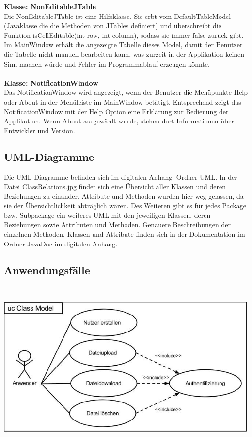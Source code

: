 \documentclass[13pt,a4paper,bibliography=totocnumbered,listof=totocnumbered]{scrartcl}
\begin{document}
\textbf{Klasse: NonEditableJTable}\\
Die NonEditableJTable ist eine Hilfsklasse. Sie erbt vom DefaultTableModel (Javaklasse die die Methoden von JTables definiert) und überschreibt die Funktion isCellEditable(int row, int column), sodass sie immer false zurück gibt. Im MainWindow erhält die angezeigte Tabelle dieses Model, damit der Benutzer die Tabelle nicht manuell bearbeiten kann, was zurzeit in der Applikation keinen Sinn machen würde und Fehler im Programmablauf erzeugen könnte.\\\\
\textbf{Klasse: NotificationWindow}\\
Das NotificationWindow wird angezeigt, wenn der Benutzer die Menüpunkte Help oder About in der Menüleiste im MainWindow betätigt. Entsprechend zeigt das NotificationWindow mit der Help Option eine Erklärung zur Bedienung der Applikation. Wenn About ausgewählt wurde, stehen dort Informationen über Entwickler und Version.


\subsection{UML-Diagramme}
Die UML Diagramme befinden sich im digitalen Anhang, Ordner UML. In der Datei ClassRelations.jpg findet sich eine Übersicht aller Klassen und deren Beziehungen zu einander. Attribute und Methoden wurden hier weg gelassen, da sie der Übersichtlichkeit abträglich wären. Des Weiteren gibt es für jedes Package bzw. Subpackage ein weiteres UML mit den jeweiligen Klassen, deren Beziehungen sowie Attributen und Methoden. Genauere Beschreibungen der einzelnen Methoden, Klassen und Attribute finden sich in der Dokumentation im Ordner JavaDoc im digitalen Anhang.

\pagebreak

\subsection{Anwendungsfälle}
\vspace{0,5em}
$\;$\\
\begin{minipage}{\linewidth}
	\centering
	\includegraphics[width=0.8\linewidth]{./img/UseCase.jpg}
\end{minipage}
\vspace{0,em}
\end{document}
